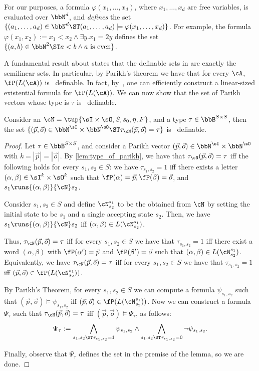 For our purposes, a \PA formula $\varphi(x_1,\ldots,x_d)$, where $x_1,\ldots, x_d$ are free variables, is evaluated over $\bbN^d$, and \emph{defines} the set $\{(a_1,\ldots,a_d)\in \bbN^d\ST (a_1,\ldots,a_d)\models \varphi(x_1,\ldots,x_d)\}$. For example, the formula $\varphi(x_1,x_2):=x_1< x_2\wedge \exists y. x_1=2y$ defines the set $\{(a,b)\in \bbN^2\ST a<b\wedge a \text{ is even}\}$.

A fundamental result about \PA states that the definable sets in \PA are exactly the semilinear sets. In particular, by Parikh's theorem we have that for every \NFA $\cA$, $\fP(L(\cA))$ is \PA~definable. In fact, by~\cite{Verma2005}, one can efficiently construct a linear-sized existential \PA formula for $\fP(L(\cA))$.
We can now show that the set of Parikh vectors whose type is $\tau$ is \PA~definable.

\begin{lemma}
	\label{lem:parikh_type_definable}
	Consider an \NFA $\cN=\tup{\sI\times \sO,S,s_0,\eta,F}$, and a type $\tau\in \bbB^{S\times S}$, then the set $\{(\vec{p},\vec{o})\in \bbN^{\sI} \times \bbN^{\sO}\ST \tau_{\cN}(\vec{p},\vec{o})=\tau\}$ is \PA~definable.
\end{lemma}
\begin{proof}
	Let $\tau\in \bbB^{S\times S}$, and consider a Parikh vector $(\vec{p},\vec{o})\in \bbN^{\sI} \times \bbN^{\sO}$ with $k=|\vec{p}|=|\vec{o}|$. By \cref{lem:type_of_parikh}, we have that $\tau_{\cN}(\vec{p},\vec{o})=\tau$ iff the following holds for every $s_1,s_2\in S$: we have $\tau_{s_1,s_2}=1$ iff 
	there exists a letter $(\alpha,\beta)\in \sI^k\times \sO^k$ such that $\fP(\alpha)=\vec{p},\fP(\beta)=\vec{o}$, and $s_1\runs{(\alpha,\beta)}{\cN} s_2$.

	Consider $s_1,s_2\in S$ and define $\cN^{s_1}_{s_2}$ to be the \NFA obtained from $\cN$ by setting the initial state to be $s_1$ and a single accepting state $s_2$.
	Then, we have $s_1\runs{(\alpha,\beta)}{\cN} s_2$ iff $(\alpha,\beta)\in L(\cN^{s_1}_{s_2})$. 
	
	Thus, $\tau_{\cN}(\vec{p},\vec{o})=\tau$ iff for every $s_1,s_2\in S$ we have that $\tau_{s_1,s_2}=1$ iff there exist a word $(\alpha,\beta)$ with $\fP(\alpha')=\vec{p}$ and $\fP(\beta')=\vec{o}$ such that $(\alpha,\beta)\in L(\cN^{s_1}_{s_2})$.
	Equivalently, we have $\tau_{\cN}(\vec{p},\vec{o})=\tau$ iff for every $s_1,s_2\in S$ we have that $\tau_{s_1,s_2}=1$ iff $(\vec{p},\vec{o})\in \fP(L(\cN^{s_1}_{s_2}))$.
	
	By Parikh's Theorem, for every $s_1,s_2\in S$ we can compute a \PA formula $\psi_{s_1,s_2}$ such that $(\vec{p},\vec{o})\models \psi_{s_1,s_2}$ iff $(\vec{p},\vec{o})\in \fP(L(\cN^{s_1}_{s_2}))$. Now we can construct a \PA formula $\Psi_{\tau}$ such that $\tau_{\cN}(\vec{p},\vec{o})=\tau$ iff $(\vec{p},\vec{o})\models \Psi_\tau$, as follows:
	\[\Psi_\tau:= \bigwedge_{s_1,s_2\ST \tau_{s_1,s_2}=1} \psi_{s_1,s_2}\wedge \bigwedge_{s_1,s_2\ST \tau_{s_1,s_2}=0}\neg \psi_{s_1,s_2}.\]
	
	Finally, observe that $\Psi_\tau$ defines the set in the premise of the lemma, so we are done.
\end{proof}

